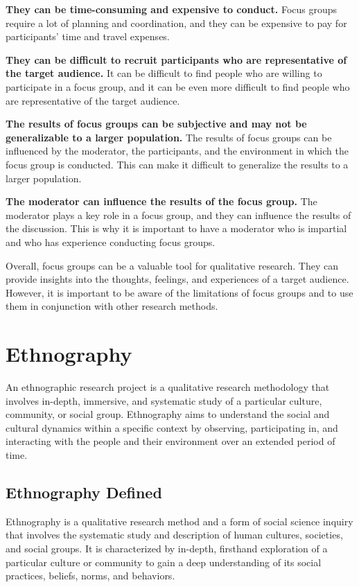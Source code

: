 \documentclass[
  b5paper]{book}
\begin{document}
\textbf{They can be time-consuming and expensive to conduct.} Focus groups require a lot of planning and coordination, and they can be expensive to pay for participants' time and travel expenses.

\textbf{They can be difficult to recruit participants who are representative of the target audience.} It can be difficult to find people who are willing to participate in a focus group, and it can be even more difficult to find people who are representative of the target audience.

\textbf{The results of focus groups can be subjective and may not be generalizable to a larger population.} The results of focus groups can be influenced by the moderator, the participants, and the environment in which the focus group is conducted. This can make it difficult to generalize the results to a larger population.

\textbf{The moderator can influence the results of the focus group.} The moderator plays a key role in a focus group, and they can influence the results of the discussion. This is why it is important to have a moderator who is impartial and who has experience conducting focus groups.

Overall, focus groups can be a valuable tool for qualitative research. They can provide insights into the thoughts, feelings, and experiences of a target audience. However, it is important to be aware of the limitations of focus groups and to use them in conjunction with other research methods.

\hypertarget{ethnography-1}{%
\chapter{Ethnography}\label{ethnography-1}}

An ethnographic research project is a qualitative research methodology that involves in-depth, immersive, and systematic study of a particular culture, community, or social group. Ethnography aims to understand the social and cultural dynamics within a specific context by observing, participating in, and interacting with the people and their environment over an extended period of time.

\hypertarget{ethnography-defined}{%
\section{Ethnography Defined}\label{ethnography-defined}}

Ethnography is a qualitative research method and a form of social science inquiry that involves the systematic study and description of human cultures, societies, and social groups. It is characterized by in-depth, firsthand exploration of a particular culture or community to gain a deep understanding of its social practices, beliefs, norms, and behaviors.
\end{document}
